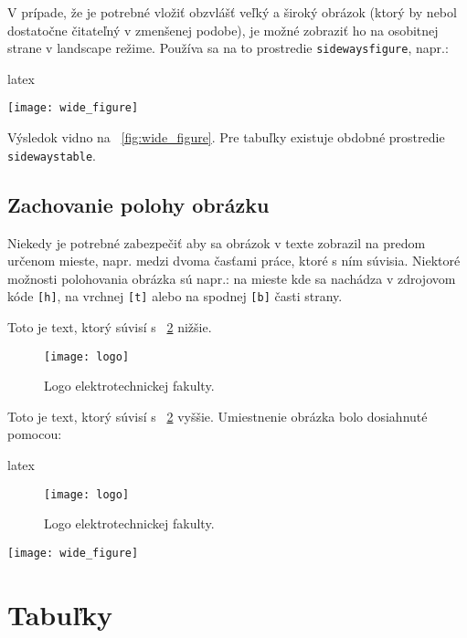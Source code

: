 V prípade, že je potrebné vložiť obzvlášť veľký a široký obrázok (ktorý by nebol dostatočne čitateľný v zmenšenej podobe), je možné zobraziť ho na osobitnej strane v landscape režime. Používa sa na to prostredie \texttt{sidewaysfigure}, napr.:
\begin{inlinecode}{latex}
\begin{sidewaysfigure}[p]
\centering
\texttt{[image: wide\_figure]}
\caption{Obzvlášť veľký a široký obrázok.}
\end{sidewaysfigure}
\end{inlinecode}

Výsledok vidno na \figurename~\ref{fig:wide_figure}. Pre tabuľky existuje obdobné prostredie \texttt{sidewaystable}.


\subsection{Zachovanie polohy obrázku}

Niekedy je potrebné zabezpečiť aby sa obrázok v texte zobrazil na predom určenom mieste, napr. medzi dvoma časťami práce, ktoré s ním súvisia. Niektoré možnosti polohovania obrázka sú napr.: na mieste kde sa nachádza v zdrojovom kóde \texttt{[h]}, na vrchnej \texttt{[t]} alebo na spodnej \texttt{[b]} časti strany. 

Toto je text, ktorý súvisí s \figurename~\ref{fig:obrazok2} nižšie.

\begin{figure}[h]
\centering
\texttt{[image: logo]}
\caption{Logo elektrotechnickej fakulty.}
\label{fig:obrazok2}
\end{figure}

Toto je text, ktorý súvisí s \figurename~\ref{fig:obrazok2} vyššie. Umiestnenie obrázka bolo dosiahnuté pomocou:

\begin{inlinecode}{latex}
\begin{figure}[h]
\centering
\texttt{[image: logo]}
\caption{Logo elektrotechnickej fakulty.}
\label{fig:obrazok2}
\end{figure}
\end{inlinecode}

\begin{sidewaysfigure}[p]
\centering
\texttt{[image: wide\_figure]}
\caption{Obzvlášť veľký a široký obrázok.}
\label{fig:wide_figure}
\end{sidewaysfigure}


\section{Tabuľky}

